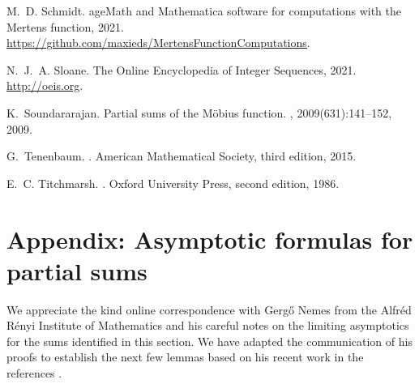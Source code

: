\documentclass[11pt,reqno,a4letter]{article}
\numberwithin{figure}{section}
\numberwithin{table}{section}
\theoremstyle{plain}
\numberwithin{theorem}{section}
\theoremstyle{definition}
\begin{document}
\begin{thebibliography}{10}
M.~D. Schmidt.
age{M}ath and {M}athematica software for computations with the
  {M}ertens function, 2021.
\newblock \url{https://github.com/maxieds/MertensFunctionComputations}.

N.~J.~A. Sloane.
\newblock The {O}nline {E}ncyclopedia of {I}nteger {S}equences, 2021.
\newblock \url{http://oeis.org}.

K.~Soundararajan.
\newblock Partial sums of the {M}{\"{o}}bius function.
, 2009(631):141--152, 2009.

G.~Tenenbaum.
.
\newblock American Mathematical Society, third edition, 2015.

E.~C. Titchmarsh.
.
\newblock Oxford University Press, second edition, 1986.

\end{thebibliography}

\setcounter{section}{0} 
\renewcommand{\thesection}{\Alph{section}} 

\newpage
\section{Appendix: Asymptotic formulas for partial sums} 
\label{subSection_OtherFactsAndResults} 

We appreciate the kind online correspondence with Gerg\H{o} Nemes 
from the Alfr\'{e}d R\'{e}nyi Institute of Mathematics and his 
careful notes on the limiting asymptotics for the sums identified in this section. 
We have adapted the communication of his proofs to establish the next few lemmas based on his 
recent work in the references \cite{NEMES2015C,NEMES2016,NEMES2019}. 
\end{document}
